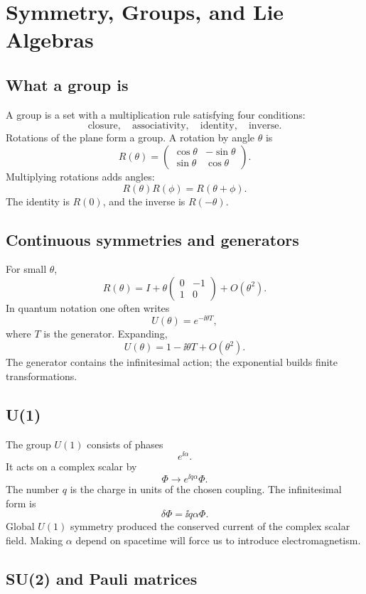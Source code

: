 \chapter{Symmetry, Groups, and Lie Algebras}

\section{What a group is}

A group is a set with a multiplication rule satisfying four conditions:
\[
  \text{closure},\quad \text{associativity},\quad \text{identity},\quad \text{inverse}.
\]
Rotations of the plane form a group.  A rotation by angle \(\theta\) is
\[
  R(\theta)=
  \begin{pmatrix}
  \cos\theta&-\sin\theta\\
  \sin\theta&\cos\theta
  \end{pmatrix}.
\]
Multiplying rotations adds angles:
\[
  R(\theta)R(\phi)=R(\theta+\phi).
\]
The identity is \(R(0)\), and the inverse is \(R(-\theta)\).

\section{Continuous symmetries and generators}

For small \(\theta\),
\[
  R(\theta)
  =
  I+\theta
  \begin{pmatrix}
  0&-1\\
  1&0
  \end{pmatrix}
  +O(\theta^2).
\]
In quantum notation one often writes
\[
  U(\theta)=e^{-\ii\theta T},
\]
where \(T\) is the generator.  Expanding,
\[
  U(\theta)=1-\ii\theta T+O(\theta^2).
\]
The generator contains the infinitesimal action; the exponential builds finite transformations.

\section{U(1)}

The group \(U(1)\) consists of phases
\[
  e^{\ii\alpha}.
\]
It acts on a complex scalar by
\[
  \Phi\to e^{\ii q\alpha}\Phi.
\]
The number \(q\) is the charge in units of the chosen coupling.  The infinitesimal form is
\[
  \delta\Phi=\ii q\alpha\Phi.
\]
Global \(U(1)\) symmetry produced the conserved current of the complex scalar field.  Making \(\alpha\) depend on spacetime will force us to introduce electromagnetism.

\section{SU(2) and Pauli matrices}

